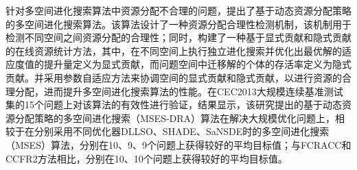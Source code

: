 \begin{cabstract}
 针对多空间进化搜索算法中资源分配不合理的问题，提出了基于动态资源分配策略的多空间进化搜索算法。该算法设计了一种资源分配合理性检测机制，该机制用于检测不同空间之间资源分配的合理性；同时，构建了一种基于显式贡献和隐式贡献的在线资源统计方法，其中，在不同空间上执行独立进化搜索并优化出最优解的适应度值的提升量定义为显式贡献，而问题空间中迁移解的个体的存活率定义为隐式贡献。并采用参数自适应方法来协调空间的显式贡献和隐式贡献，以进行资源的合理分配，进而提升多空间进化搜索算法的性能。在CEC2013大规模连续基准测试集的15个问题上对该算法的有效性进行验证，结果显示，该研究提出的基于动态资源分配策略的多空间进化搜索（MSES-DRA）算法在解决大规模优化问题上，相较于在分别采用不同优化器DLLSO、SHADE、SaNSDE时的多空间进化搜索（MSES）算法，分别在10、9、9个问题上获得较好的平均目标值；与FCRACC和CCFR2方法相比，分别在10、10个问题上获得较好的平均目标值。
\end{cabstract}

